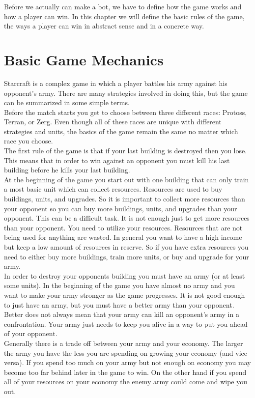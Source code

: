 Before we actually can make a bot, we have to define how the game works and how a player can win.
In this chapter we will define the basic rules of the game, the ways a player can win in abstract sense and in a concrete way.

\section{Basic Game Mechanics}
	Starcraft is a complex game in which a player battles his army against his opponent's army. 
	There are many strategies involved in doing this, but the game can be summarized in some simple terms.\\
	Before the match starts you get to choose between three different races: Protoss, Terran, or Zerg. 
	Even though all of these races are unique with different strategies and units, 
	the basics of the game remain the same no matter which race you choose.\\	
	The first rule of the game is that if your last building is destroyed then you lose. 
	This means that in order to win against an opponent you must kill his last building before he kills your last building. \\	
	At the beginning of the game you start out with one building that can only train a most basic unit which can collect resources. 
	Resources are used to buy buildings, units, and upgrades. 
	So it is important to collect more resources than your opponent so you can buy more buildings, units, and upgrades than your opponent.
	This can be a difficult task. It is not enough just to get more resources than your opponent. 
	You need to utilize your resources. Resources that are not being used for anything are wasted. 
	In general you want to have a high income but keep a low amount of resources in reserve. 
	So if you have extra resources you need to either buy more buildings, train more units, or buy and upgrade for your army.\\
	In order to destroy your opponents building you must have an army (or at least some units). 
	In the beginning of the game you have almost no army and you want to make your army stronger as the game progresses. 
	It is not good enough to just have an army, but you must have a better army than your opponent. 
	Better does not always mean that your army can kill an opponent's army in a confrontation. 
	Your army just needs to keep you alive in a way to put you ahead of your opponent.\\	
	Generally there is a trade off between your army and your economy. 
	The larger the army you have the less you are spending on growing your economy (and vice versa). 
	If you spend too much on your army but not enough on economy you may become too far behind later in the game to win. 
	On the other hand if you spend all of your resources on your economy the enemy army could come and wipe you out.\\

 